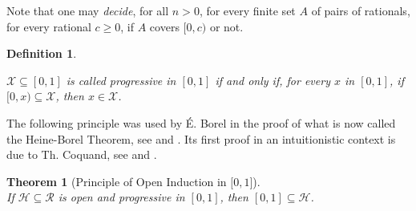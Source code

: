 \documentclass[a4paper]{amsart}
\theoremstyle{plain}
\newtheorem{theorem}{Theorem}
\newtheorem{definition}{Definition}
\begin{document}
Note that one may \emph{decide}, for all $n>0$, for every finite set $A$ of pairs of rationals, for every rational $c\ge 0$, if $A$ covers $[0,c)$ or not.
\begin{definition}\label{D:progressive}


$\mathcal{X}\subseteq [0,1]$ is called \emph{progressive in $[0,1]$} if and only if, for every $x$ in $[0,1]$, if $[0,x)\subseteq \mathcal{X}$, then $x\in \mathcal{X}$. \end{definition}

The following principle was used by \'E. Borel in the proof of what is now called the Heine-Borel Theorem, see \cite{borel} and \cite[Section 4.3]{veldman2011c}.  Its first proof in an intuitionistic context is due to Th. Coquand, see \cite{coquand} and \cite[Theorem 4.1]{veldman2011c}. 
\begin{theorem}[Principle of Open Induction in ${[} 0, 1{]} $] \label{T:openinduction}\;\\ If $\mathcal{H}\subseteq \mathcal{R}$ is open and progressive in $[0,1]$, then $[0,1]\subseteq \mathcal{H}$. \end{theorem}
\end{document}
